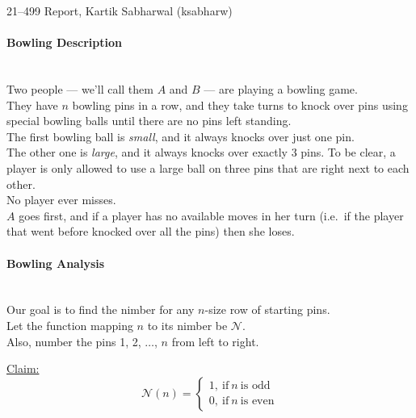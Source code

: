 \documentclass{article}
\newcommand{\T}[1]{\text{#1}}
\newcommand{\nim}{\mathcal{N}}
\newenvironment{claim}[1]{\par\noindent\underline{Claim:}\space#1}{}
\begin{document}
\begin{center}
  21--499 Report, Kartik Sabharwal (ksabharw) \\
\end{center}
\paragraph{Bowling Description}\mbox{}\\
Two people --- we'll call them $A$ and $B$ --- are playing a bowling game. \\
They have $n$ bowling pins in a row, and they take turns to knock over
pins using special bowling balls until there are no pins left standing. \\
The first bowling ball is \textit{small}, and it always knocks over
just one pin. \\
The other one is \textit{large}, and it always knocks over exactly 3 pins. To
be clear, a player is only allowed to use a large ball on three pins
that are right next to each other. \\
No player ever misses. \\
$A$ goes first, and if a player has no available moves in her turn
(i.e.\ if the player that went before knocked over all the pins) then she
loses.
\bigskip

\paragraph{Bowling Analysis}\mbox{}\\
Our goal is to find the nimber for any $n$-size row of starting pins. \\
Let the function mapping $n$ to its nimber be $\nim$. \\
Also, number the pins 1, 2, $\ldots$, $n$ from left to right.
\bigskip

\begin{claim}
\begin{equation*}
  \nim(n) =
  \begin{cases}
    1,\ \T{if}\ n\ \T{is odd} \\
    0,\ \T{if}\ n\ \T{is even}
  \end{cases}
\end{equation*}
\end{claim}
\end{document}
